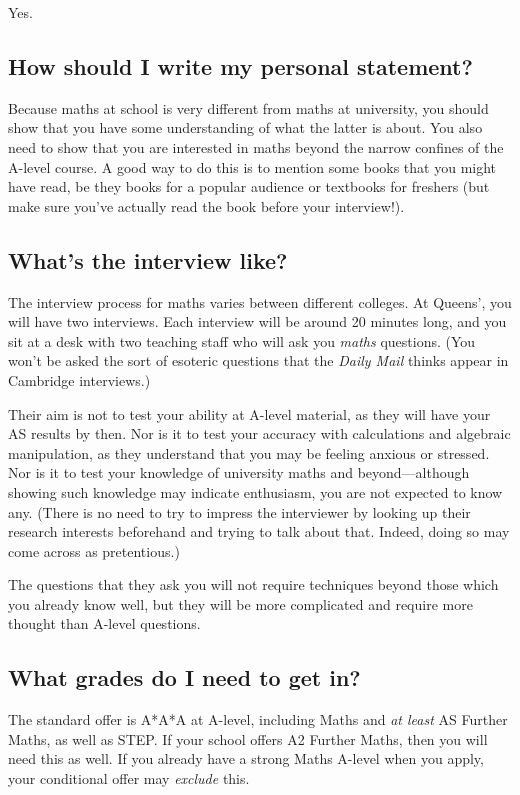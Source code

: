 \documentclass[a4paper]{article}
\begin{document}
Yes.

\subsection{How should I write my personal statement?}

Because maths at school is very different from maths at university, you should
show that you have some understanding of what the latter is about. You also need
to show that you are interested in maths beyond the narrow confines of the
A-level course. A good way to do this is to mention some books that you might
have read, be they books for a popular audience or textbooks for freshers (but
make sure you've actually read the book before your interview!). 

\subsection{What's the interview like?}

The interview process for maths varies between different colleges. At Queens',
you will have two interviews. Each interview will be around 20 minutes long, and
you sit at a desk with two teaching staff who will ask you \textit{maths}
questions. (You won't be asked the sort of esoteric questions that the
\textit{Daily Mail} thinks appear in Cambridge interviews.)

Their aim is not to test your ability at A-level material, as they will have
your AS results by then. Nor is it to test your accuracy with calculations and
algebraic manipulation, as they understand that you may be feeling anxious or
stressed. Nor is it to test your knowledge of university maths and
beyond---although showing such knowledge may indicate enthusiasm, you are not
expected to know any. (There is no need to try to impress the interviewer by
looking up their research interests beforehand and trying to talk about that.
Indeed, doing so may come across as pretentious.) 

The questions that they ask you will not require techniques beyond those which
you already know well, but they will be more complicated and require more
thought than A-level questions. 

\subsection{What grades do I need to get in?}

The standard offer is A*A*A at A-level, including Maths and \textit{at least} AS
Further Maths, as well as STEP. If your school offers A2 Further Maths, then you
will need this as well. If you already have a strong Maths A-level when you
apply, your conditional offer may \textit{exclude} this. 
\end{document}
